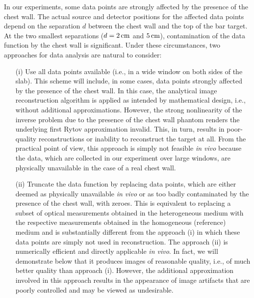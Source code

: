 In our experiments, some data points are strongly affected by the presence of the chest wall. The actual source and detector positions for the affected data points depend on the separation $d$ between the chest wall and the top of the bar target. At the two smallest separations ($d=2\,{\rm cm}$ and $5\,{\rm cm}$), contamination of the data function by the chest wall is significant. Under these circumstances, two approaches for data analysis are natural to consider:

\begin{itemize}
  
\item[(i)] Use all data points available (i.e., in a wide window on both sides of the slab). This scheme will include, in some cases, data points strongly affected by the presence of the chest wall. In this case, the analytical image reconstruction algorithm is applied as intended by mathematical design, i.e., without additional approximations. However, the strong nonlinearity of the inverse problem due to the presence of the chest wall phantom renders the
  underlying first Rytov approximation invalid. This, in turn, results in poor-quality reconstructions or inability to reconstruct the target at all. From the practical point of view, this approach is simply not feasible {\em in vivo} because the data, which are collected in our experiment over large windows, are physically unavailable in the case of a real chest wall.

\item[(ii)] Truncate the data function by replacing data points, which are either deemed as physically unavailable {\em in vivo} or as too badly contaminated by the presence of the chest wall, with zeroes. This is equivalent to replacing a subset of optical measurements obtained in the heterogeneous medium with the respective measurements obtained in the homogeneous (reference) medium and is substantially different from the approach (i) in which these data points are simply not used in reconstruction. The approach (ii) is numerically efficient and directly applicable {\em in vivo}. In fact, we will demonstrate below that it produces images of reasonable quality, i.e., of much better quality than approach (i). However, the additional approximation involved in this approach results in the appearance of image artifacts that are poorly controlled and may be viewed as undesirable.

\end{itemize}

